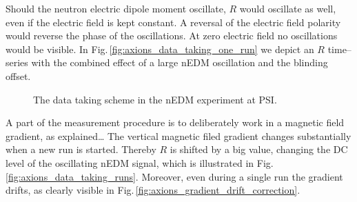 Should the neutron electric dipole moment oscillate, $R$ would oscillate as well, even if the electric field is kept constant. A reversal of the electric field polarity would reverse the phase of the oscillations. At zero electric field no oscillations would be visible. In Fig.\,\ref{fig:axions_data_taking_one_run} we depict an $R$ time--series with the combined effect of a large nEDM oscillation and the blinding offset.

\begin{figure}[bth]
  \myfloatalign
  \quad
  \caption{The data taking scheme in the nEDM experiment at PSI.}
\end{figure}

A part of the measurement procedure is to deliberately work in a magnetic field gradient, as explained\ldots {} The vertical magnetic filed gradient changes substantially when a new run is started.  Thereby $R$ is shifted by a big value, changing the DC level of the oscillating nEDM signal, which is illustrated in Fig.\,\ref{fig:axions_data_taking_runs}. Moreover, even during a single run the gradient drifts, as clearly visible in Fig.\,\ref{fig:axions_gradient_drift_correction}. 

